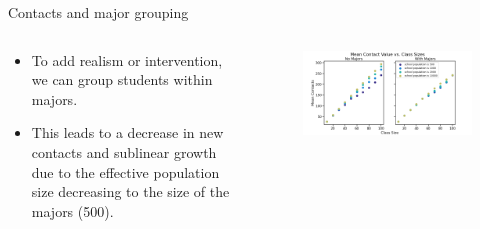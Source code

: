 \documentclass[aspectratio=169]{beamer}
\begin{document}
\begin{frame}{Contacts and major grouping}
    \vfill
    \begin{columns}
    \begin{column}{.3\textwidth}
        \begin{itemize}
            \item To add realism or intervention, we can group students within majors.
            \item This leads to a decrease in new contacts and sublinear growth due to the effective population size decreasing to the size of the majors (500).
        \end{itemize}
    \end{column}
    \begin{column}{.7\textwidth}
        \begin{figure}[H]
            \centering
            \includegraphics[width=\textwidth]{figures/contacts_vs_population_majors.png}
        \end{figure}
    \end{column}
    \end{columns}
    \vfill
\end{frame}
\end{document}
